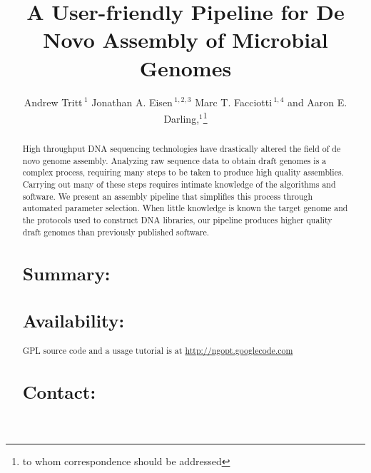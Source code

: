\documentclass{bioinfo}
\begin{document}

\title[a5]{A User-friendly Pipeline for De Novo Assembly of Microbial Genomes}
\author[Tritt \textit{et~al}]{Andrew Tritt\,$^{1}$ Jonathan A. Eisen\,$^{1,2,3}$ Marc T. Facciotti\,$^{1,4}$ and Aaron E. Darling,$^{1}$\footnote{to whom correspondence should be addressed}}
\address{$^{1}$Genome Center, $^{2}$ Dept. of Evolution and Ecology, $^{3}$ Medical Microbiology and Immunology, 
$^{4}$ Biomedical Engineering, University of California-Davis, Davis, CA 95616.}



\maketitle

\begin{abstract}
High throughput DNA sequencing technologies have drastically altered the field of de novo genome assembly. Analyzing
raw sequence data to obtain draft genomes is a complex process, requiring many steps to be taken to produce high
quality assemblies. Carrying out many of these steps requires intimate knowledge of the algorithms and software. 
We present an assembly pipeline that simplifies this process through automated parameter selection. When little
knowledge is known the target genome and the protocols used to construct DNA libraries, our pipeline produces
higher quality draft genomes than previously published software. 

\section{Summary:}
\section{Availability:}
GPL source code and a usage tutorial is at \href{http://ngopt.googlecode.com}{http://ngopt.googlecode.com}

\section{Contact:} \href{rabid apes}{}
\end{abstract}
\end{document}
